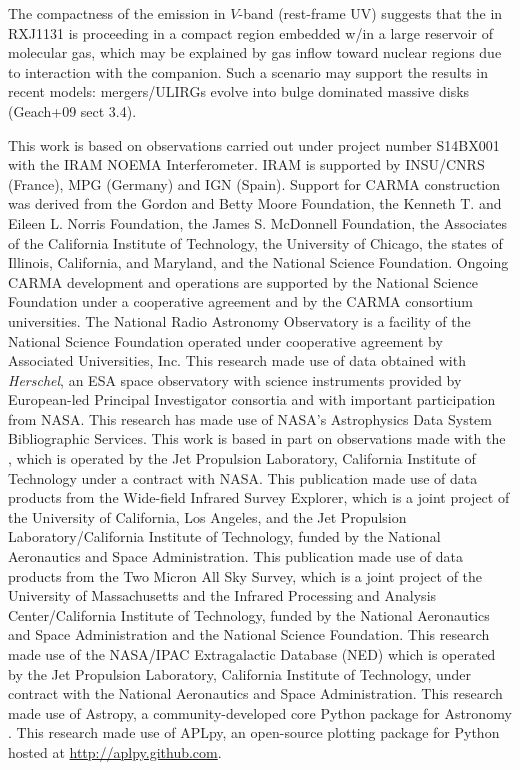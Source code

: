\documentclass[]{emulateapj}
\begin{document}
The compactness of the emission in $V$-band (rest-frame UV) 
suggests that the \SF in RXJ1131 is proceeding in a 
compact region embedded w/in a large reservoir of molecular gas, which may be explained 
by gas inflow toward nuclear regions due to interaction with the companion. 
Such a scenario may support the results in recent models: mergers/ULIRGs evolve into bulge dominated massive disks (Geach+09 sect 3.4).




\acknowledgments
This work is based on observations carried out under project number S14BX001
with the IRAM NOEMA Interferometer. IRAM is supported by INSU/CNRS (France), MPG (Germany) and IGN (Spain).
Support for CARMA construction was derived from the Gordon and Betty Moore
Foundation, the Kenneth T. and Eileen L. Norris Foundation, the James S.
McDonnell Foundation, the Associates of the California Institute of
Technology, the University of Chicago, the states of Illinois, California, and
Maryland, and the National Science Foundation. Ongoing CARMA development and
operations are supported by the National Science Foundation under a
cooperative agreement and by the CARMA consortium universities.
The National Radio Astronomy Observatory is a facility of the National Science
Foundation operated under cooperative agreement by Associated
Universities, Inc.
This research made use of data obtained with {\it Herschel}, an ESA space
observatory with science instruments provided by European-led Principal
Investigator consortia and with important participation from NASA.
This research has made use of NASA's Astrophysics Data System Bibliographic
Services.
This work is based in part on observations made with the \spitzer,
which is operated by the Jet Propulsion Laboratory, California Institute of
Technology under a contract with NASA.
This publication made use of data products from the Wide-field Infrared
Survey Explorer, which is a joint project of the University of California, Los
Angeles, and the Jet Propulsion Laboratory/California Institute of Technology,
funded by the National Aeronautics and Space Administration.
This publication made use of data products from the Two Micron All Sky
Survey, which is a joint project of the University of Massachusetts and the
Infrared Processing and Analysis Center/California Institute of Technology,
funded by the National Aeronautics and Space Administration and the National
Science Foundation.
This research made use of the NASA/IPAC Extragalactic Database (NED) which
is operated by the Jet Propulsion Laboratory, California Institute of
Technology, under contract with the National Aeronautics and Space
Administration.
This research made use of Astropy, a community-developed core Python package for Astronomy \citep{astropy}.
This research made use of APLpy, an open-source plotting package for Python hosted at \url{http://aplpy.github.com}.
\end{document}
